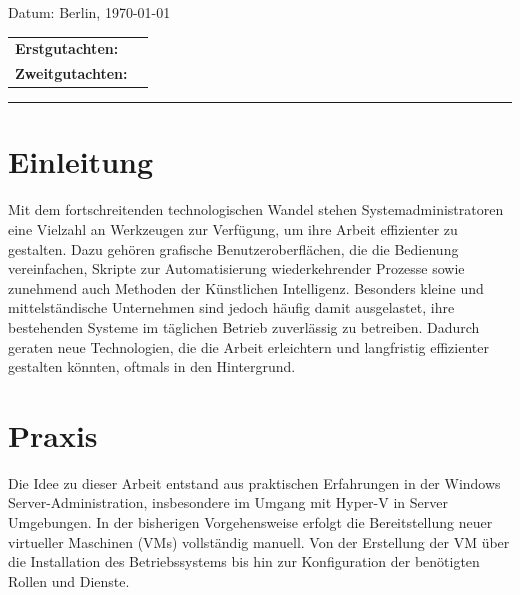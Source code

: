 \documentclass[a4paper,12pt]{article}
\begin{document}
\begin{titlepage}
    \begin{center}
        {\Large Datum: Berlin, \today}
    \end{center}


\begin{center}
    \begin{tabular}{ll}
        {\bfseries\large Erstgutachten:} &  \\
        {\bfseries\large Zweitgutachten:} &  \\
    \end{tabular}
\end{center}


    \textcolor{HTW}{\rule{\linewidth}{0.4mm}}

\end{titlepage}


\newpage

\tableofcontents

\newpage

\section{Einleitung}

Mit dem fortschreitenden technologischen Wandel stehen Systemadministratoren eine Vielzahl an Werkzeugen zur Verfügung, um ihre Arbeit effizienter zu gestalten. Dazu gehören grafische Benutzeroberflächen, die die Bedienung vereinfachen, Skripte zur Automatisierung wiederkehrender Prozesse sowie zunehmend auch Methoden der Künstlichen Intelligenz.
Besonders kleine und mittelständische Unternehmen sind jedoch häufig damit ausgelastet, ihre bestehenden Systeme im täglichen Betrieb zuverlässig zu betreiben. Dadurch geraten neue Technologien, die die Arbeit erleichtern und langfristig effizienter gestalten könnten, oftmals in den Hintergrund.\\

\section{Praxis}

Die Idee zu dieser Arbeit entstand aus praktischen Erfahrungen in der Windows Server-Administration, insbesondere im Umgang mit Hyper-V in Server Umgebungen. 
In der bisherigen Vorgehensweise erfolgt die Bereitstellung neuer virtueller Maschinen (VMs) vollständig manuell. Von der Erstellung der VM über die Installation des Betriebssystems bis hin zur Konfiguration der benötigten Rollen und Dienste.\\
\end{document}
